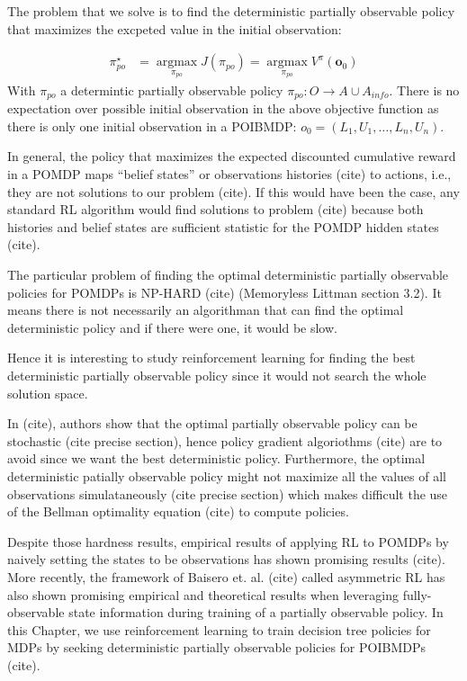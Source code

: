 The problem that we solve is to find the deterministic partially observable policy that maximizes the excpeted value in the initial observation:
\begin{definition}
\begin{align}
    \pi_{po}^{\star} &= \underset{\pi_{po}}{\operatorname{argmax}}J(\pi_{po}) = \underset{\pi_{po}}{\operatorname{argmax}}V^{\pi}(\boldsymbol{o}_0)
\end{align}
With $\pi_{po}$ a determintic partially observable policy $\pi_{po}:O\rightarrow A\cup A_{info}$. There is no expectation over possible initial observation in the above objective function as there is only one initial observation in a POIBMDP: $o_0=(L_1, U_1, \dots, L_n, U_n)$.
\end{definition}
In general, the policy that maximizes the expected discounted cumulative reward in a POMDP maps ``belief states'' or observations histories (cite) to actions, i.e., they are not solutions to our problem (cite).
If this would have been the case, any standard RL algorithm would find solutions to problem (cite) because both histories and belief states are sufficient statistic for the POMDP hidden states (cite).

The particular problem of finding the optimal deterministic partially observable policies for POMDPs is NP-HARD (cite) (Memoryless Littman section 3.2).
It means there is not necessarily an algorithman that can find the optimal deterministic policy and if there were one, it would be slow.

Hence it is interesting to study reinforcement learning for finding the best deterministic partially observable policy since it would not search the whole solution space.

In (cite), authors show that the optimal partially observable policy can be stochastic (cite precise section), hence policy gradient algoriothms (cite) are to avoid since we want the best deterministic policy. 
Furthermore, the optimal deterministic patially observable policy might not maximize all the values of all observations simulataneously (cite precise section) which makes difficult the use of the Bellman optimality equation (cite) to compute policies.

Despite those hardness results, empirical results of applying RL to POMDPs by naively setting the states to be observations has shown promising results (cite). 
More recently, the framework of Baisero et. al. (cite) called asymmetric RL has also shown promising empirical and theoretical results when leveraging fully-observable state information during training of a partially observable policy.
In this Chapter, we use reinforcement learning to train decision tree policies for MDPs by seeking deterministic partially observable policies for POIBMDPs (cite).  

